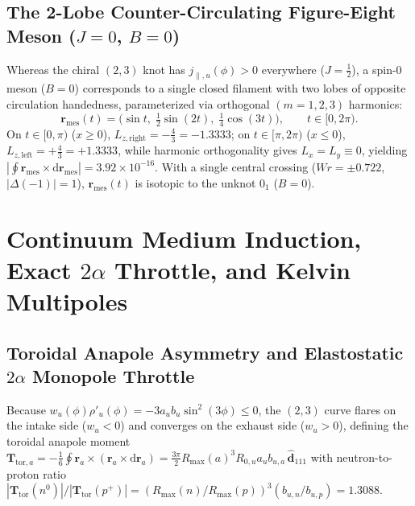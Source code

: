 \documentclass[11pt, a4paper]{article}
\DeclareRobustCommand{\dd}{\mathrm{d}}
\DeclareRobustCommand{\Rmax}{R_{\max}}
\begin{document}
\subsection{\texorpdfstring{The 2-Lobe Counter-Circulating Figure-Eight Meson ($J = 0$, $B = 0$)}{The 2-Lobe Counter-Circulating Figure-Eight Meson}}
Whereas the chiral $(2,3)$ knot has $j_{\parallel,u}(\phi) > 0$ everywhere ($J = \frac{1}{2}$), a spin-$0$ meson ($B = 0$) corresponds to a single closed filament with two lobes of opposite circulation handedness, parameterized via orthogonal $(m = 1, 2, 3)$ harmonics:
\begin{equation}
    \mathbf{r}_{\mathrm{mes}}(t) = \Big(\sin t,\; \tfrac{1}{2}\sin(2t),\; \tfrac{1}{4}\cos(3t)\Big), \qquad t \in [0, 2\pi).
    \label{eq:two_lobe_meson}
\end{equation}
On $t \in [0, \pi)$ ($x \ge 0$), $L_{z,\mathrm{right}} = -\frac{4}{3} = -1.3333$; on $t \in [\pi, 2\pi)$ ($x \le 0$), $L_{z,\mathrm{left}} = +\frac{4}{3} = +1.3333$, while harmonic orthogonality gives $L_x = L_y \equiv 0$, yielding $|\oint \mathbf{r}_{\mathrm{mes}}\times\dd\mathbf{r}_{\mathrm{mes}}| = 3.92 \times 10^{-16}$. With a single central crossing ($Wr = \pm 0.722$, $|\Delta(-1)| = 1$), $\mathbf{r}_{\mathrm{mes}}(t)$ is isotopic to the unknot $0_1$ ($B = 0$).

\section{\texorpdfstring{Continuum Medium Induction, Exact $2\alpha$ Throttle, and Kelvin Multipoles}{Continuum Medium Induction, Exact 2-Alpha Throttle, and Kelvin Multipoles}}
\label{sec:medium_multipoles}

\subsection{\texorpdfstring{Toroidal Anapole Asymmetry and Elastostatic $2\alpha$ Monopole Throttle}{Toroidal Anapole Asymmetry and Elastostatic 2-Alpha Monopole Throttle}}
Because $w_u(\phi)\rho'_u(\phi) = -3a_u b_u\sin^2(3\phi) \le 0$, the $(2,3)$ curve flares on the intake side ($w_u < 0$) and converges on the exhaust side ($w_u > 0$), defining the toroidal anapole moment $\mathbf{T}_{\mathrm{tor},a} = -\frac{1}{6}\oint \mathbf{r}_a\times(\mathbf{r}_a\times\dd\mathbf{r}_a) = \frac{3\pi}{2}\Rmax(a)^3 R_{0,u} a_u b_{u,a}\,\hat{\mathbf{d}}_{111}$ with neutron-to-proton ratio $|\mathbf{T}_{\mathrm{tor}}(n^0)|/|\mathbf{T}_{\mathrm{tor}}(p^+)| = (\Rmax(n)/\Rmax(p))^3(b_{u,n}/b_{u,p}) = \mathbf{1.3088}$.
\end{document}

